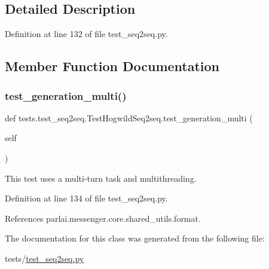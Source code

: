 \subsection{Detailed Description}


Definition at line 132 of file test\+\_\+seq2seq.\+py.



\subsection{Member Function Documentation}
\mbox{\label{classtests_1_1test__seq2seq_1_1TestHogwildSeq2seq_ae5d33c237b20de2e7bbe59058c181f38}} 
\subsubsection{\texorpdfstring{test\+\_\+generation\+\_\+multi()}{test\_generation\_multi()}}
{\footnotesize\ttfamily def tests.\+test\+\_\+seq2seq.\+Test\+Hogwild\+Seq2seq.\+test\+\_\+generation\+\_\+multi (\begin{DoxyParamCaption}\item[{}]{self }\end{DoxyParamCaption})}

\begin{DoxyVerb}This test uses a multi-turn task and multithreading.\end{DoxyVerb}
 

Definition at line 134 of file test\+\_\+seq2seq.\+py.



References parlai.\+messenger.\+core.\+shared\+\_\+utils.\+format.



The documentation for this class was generated from the following file\+:\begin{DoxyCompactItemize}
\item 
tests/\hyperlink{test__seq2seq_8py}{test\+\_\+seq2seq.\+py}\end{DoxyCompactItemize}
